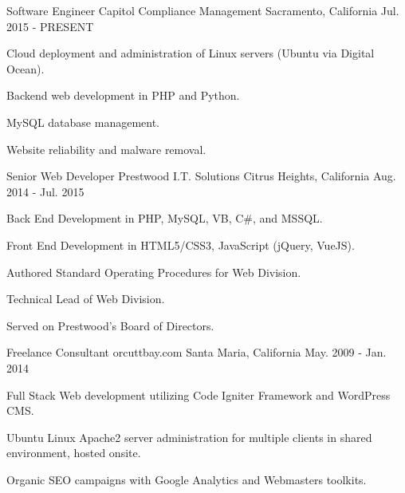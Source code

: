 

\begin{cventries}

  \cventry
    {Software Engineer} %
    {Capitol Compliance Management} %
    {Sacramento, California} %
    {Jul. 2015 - PRESENT} %
    {
      \begin{cvitems} %
        \item {Cloud deployment and administration of Linux servers (Ubuntu via Digital Ocean).}
        \item {Backend web development in PHP and Python.}
        \item {MySQL database management.}
        \item {Website reliability and malware removal.}
      \end{cvitems}
    }


  \cventry
    {Senior Web Developer} %
    {Prestwood I.T. Solutions} %
    {Citrus Heights, California} %
    {Aug. 2014 - Jul. 2015} %
    {
      \begin{cvitems} %
        \item {Back End Development in PHP, MySQL, VB, C\#, and MSSQL.}
        \item {Front End Development in HTML5/CSS3, JavaScript (jQuery, VueJS). }
        \item {Authored Standard Operating Procedures for Web Division.}
        \item {Technical Lead of Web Division.}
        \item {Served on Prestwood's Board of Directors.}
      \end{cvitems}
    }

  \cventry
    {Freelance Consultant} %
    {orcuttbay.com} %
    {Santa Maria, California} %
    {May. 2009 - Jan. 2014} %
    {
      \begin{cvitems} %
        \item {Full Stack Web development utilizing Code Igniter Framework and WordPress CMS.}
        \item {Ubuntu Linux Apache2 server administration for multiple clients in shared environment, hosted onsite. }
        \item {Organic SEO campaigns with Google Analytics and Webmasters toolkits.}
      \end{cvitems}
    }


\end{cventries}
